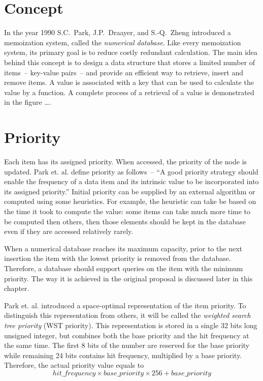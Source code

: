 

\section{Concept}
In the year 1990 S.C.~Park, J.P.~Draayer, and S.-Q.~Zheng introduced a memoization system, called the \emph{numerical database}\cite{park90}. Like every memoization system, its primary goal is to reduce costly redundant calculation. The main idea behind this concept is to design a data structure that stores a limited number of items~-- key-value pairs~-- and provide an efficient way to retrieve, insert and remove items. A value is associated with a key that can be used to calculate the value by a function. A complete process of a retrieval of a value is demonstrated in the figure ….

\section{Priority}
\label{sec:wst_priority}
Each item has its assigned priority. When accessed, the priority of the node is updated. Park et. al. define priority as follows~-- ``A good priority strategy should enable the frequency of a data item and its intrinsic value to be incorporated into its assigned priority.'' Initial priority can be supplied by an external algorithm or computed using some heuristics. For example, the heuristic can take be based on the time it took to compute the value: some items can take much more time to be computed then others, then those elements should be kept in the database even if they are accessed relatively rarely.

When a numerical database reaches its maximum capacity, prior to the next insertion the item with the lowest priority is removed from the database. Therefore, a database should support queries on the item with the minimum priority. The way it is achieved in the original proposal is discussed later in this chapter.

Park et. al. introduced a space-optimal representation of the item priority. To distinguish this representation from others, it will be called the \emph{weighted search tree priority} (WST priority). This representation is stored in a single 32 bits long unsigned integer, but combines both the base priority and the hit frequency at the same time. The first 8 bits of the number are reserved for the base priority while remaining 24 bits contains hit frequency, multiplied by a base priority.
Therefore, the actual priority value equals to
\begin{equation}
hit\_frequency \times base\_priority \times 256 + base\_priority
\end{equation}

